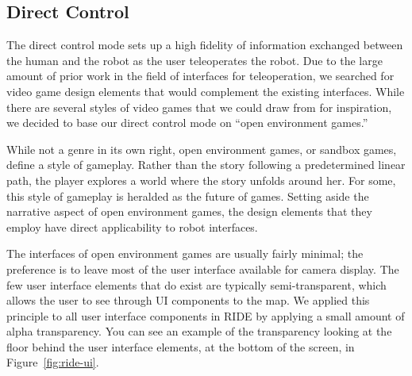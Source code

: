
% 
% 
% 
% 

\subsection{Direct Control}

The direct control mode sets up a high fidelity of information exchanged between the human and the robot as the user teleoperates the robot. Due to the large amount of prior work in the field of interfaces for teleoperation, we searched for video game design elements that would complement the existing interfaces. While there are several styles of video games that we could draw from for inspiration, we decided to base our direct control mode on ``open environment games.''

While not a genre in its own right, open environment games, or sandbox games, define a style of gameplay. Rather than the story following a predetermined linear path, the player explores a world where the story unfolds around her. For some, this style of gameplay is heralded as the future of games. Setting aside the narrative aspect of open environment games, the design elements that they employ have direct applicability to robot interfaces.

The interfaces of open environment games are usually fairly minimal; the preference is to leave most of the user interface available for camera display. The few user interface elements that do exist are typically semi-transparent, which allows the user to see through UI components to the map. We applied this principle to all user interface components in RIDE by applying a small amount of alpha transparency. You can see an example of the transparency looking at the floor behind the user interface elements, at the bottom of the screen, in Figure~\ref{fig:ride-ui}.

